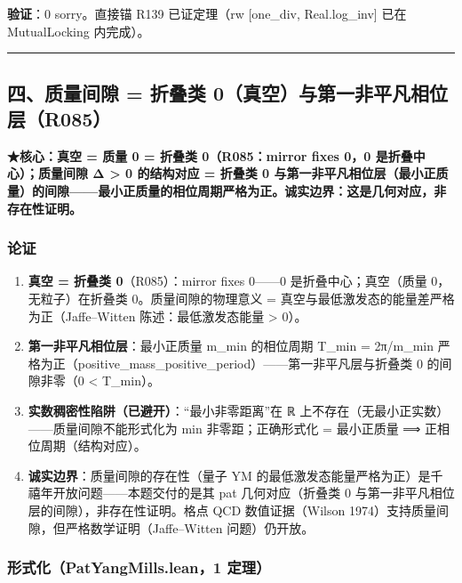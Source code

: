 \documentclass[
]{article}
\providecommand{\tightlist}{%
  \setlength{\itemsep}{0pt}\setlength{\parskip}{0pt}}
\begin{document}
\textbf{验证}：0 sorry。直接锚 R139 已证定理（rw {[}one\_div,
Real.log\_inv{]} 已在 MutualLocking 内完成）。

\begin{center}\rule{0.5\linewidth}{0.5pt}\end{center}

\subsection{四、质量间隙 = 折叠类
0（真空）与第一非平凡相位层（R085）}\label{ux56dbux8d28ux91cfux95f4ux9699-ux6298ux53e0ux7c7b-0ux771fux7a7aux4e0eux7b2cux4e00ux975eux5e73ux51e1ux76f8ux4f4dux5c42r085}

\textbf{★核心：真空 = 质量 0 = 折叠类 0（R085：mirror fixes 0，0
是折叠中心）；质量间隙 Δ \textgreater{} 0 的结构对应 = 折叠类 0
与第一非平凡相位层（最小正质量）的间隙------最小正质量的相位周期严格为正。诚实边界：这是几何对应，非存在性证明。}

\subsubsection{论证}\label{ux8bbaux8bc1-3}

\begin{enumerate}
\def\labelenumi{\arabic{enumi}.}
\tightlist
\item
  \textbf{真空 = 折叠类 0}（R085）：mirror fixes 0------0
  是折叠中心；真空（质量 0，无粒子）在折叠类 0。质量间隙的物理意义 =
  真空与最低激发态的能量差严格为正（Jaffe--Witten 陈述：最低激发态能量
  \textgreater{} 0）。
\item
  \textbf{第一非平凡相位层}：最小正质量 m\_min 的相位周期 T\_min =
  2π/m\_min
  严格为正（positive\_mass\_positive\_period）------第一非平凡层与折叠类
  0 的间隙非零（0 \textless{} T\_min）。
\item
  \textbf{实数稠密性陷阱（已避开）}：``最小非零距离''在 ℝ
  上不存在（无最小正实数）------质量间隙不能形式化为 min
  非零距；正确形式化 = 最小正质量 ⟹ 正相位周期（结构对应）。
\item
  \textbf{诚实边界}：质量间隙的存在性（量子 YM
  的最低激发态能量严格为正）是千禧年开放问题------本题交付的是其 pat
  几何对应（折叠类 0 与第一非平凡相位层的间隙），非存在性证明。格点 QCD
  数值证据（Wilson 1974）支持质量间隙，但严格数学证明（Jaffe--Witten
  问题）仍开放。
\end{enumerate}

\subsubsection{形式化（PatYangMills.lean，1
定理）}\label{ux5f62ux5f0fux5316patyangmills.lean1-ux5b9aux7406-2}
\end{document}
